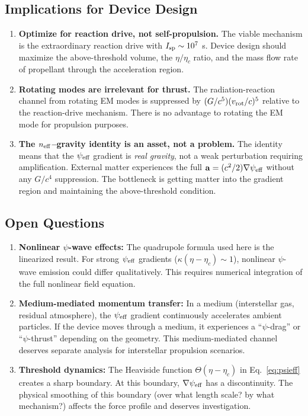 \documentclass[11pt]{article}
\newcommand{\psieff}{\psi_{\rm eff}}
\newcommand{\neff}{n_{\rm eff}}
\newcommand{\etac}{\eta_c}
\newcommand{\avec}{\mathbf{a}}
\begin{document}
\subsection{Implications for Device Design}

\begin{enumerate}
\item \textbf{Optimize for reaction drive, not self-propulsion.}
  The viable mechanism is the extraordinary reaction drive with
  $I_{\rm sp} \sim 10^7$ s. Device design should maximize the
  above-threshold volume, the $\eta/\etac$ ratio, and the mass
  flow rate of propellant through the acceleration region.

\item \textbf{Rotating modes are irrelevant for thrust.}
  The radiation-reaction channel from rotating EM modes is suppressed
  by $(G/c^5)(v_{\rm rot}/c)^5$ relative to the reaction-drive
  mechanism. There is no advantage to rotating the EM mode for
  propulsion purposes.

\item \textbf{The $\neff$--gravity identity is an asset, not a problem.}
  The identity means that the $\psieff$ gradient is \emph{real gravity},
  not a weak perturbation requiring amplification. External matter
  experiences the full $\avec = (c^2/2)\nabla\psieff$ without any
  $G/c^4$ suppression. The bottleneck is getting matter into the
  gradient region and maintaining the above-threshold condition.
\end{enumerate}

\subsection{Open Questions}

\begin{enumerate}
\item \textbf{Nonlinear $\psi$-wave effects:} The quadrupole formula
  used here is the linearized result. For strong $\psieff$ gradients
  ($\kappa(\eta - \etac) \sim 1$), nonlinear $\psi$-wave emission
  could differ qualitatively. This requires numerical integration of
  the full nonlinear field equation.

\item \textbf{Medium-mediated momentum transfer:} In a medium
  (interstellar gas, residual atmosphere), the $\psieff$ gradient
  continuously accelerates ambient particles. If the device moves through
  a medium, it experiences a ``$\psi$-drag'' or ``$\psi$-thrust''
  depending on the geometry. This medium-mediated channel deserves
  separate analysis for interstellar propulsion scenarios.

\item \textbf{Threshold dynamics:} The Heaviside function
  $\Theta(\eta - \etac)$ in Eq.~\eqref{eq:psieff} creates a sharp
  boundary. At this boundary, $\nabla\psieff$ has a discontinuity.
  The physical smoothing of this boundary (over what length scale?
  by what mechanism?) affects the force profile and deserves
  investigation.
\end{enumerate}
\end{document}
